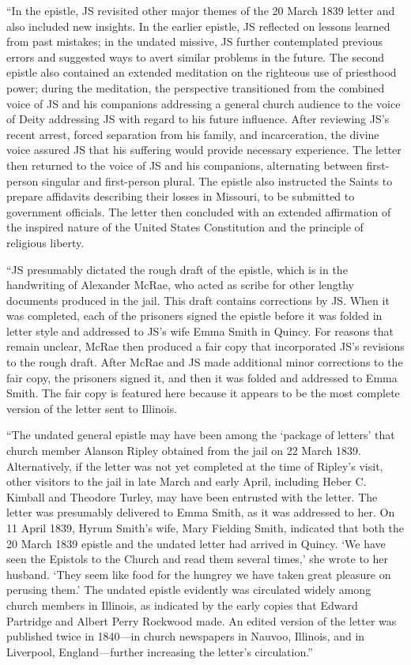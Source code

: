 			``In the epistle, JS revisited other major themes of the 20 March 1839 letter and also included new insights. In the earlier epistle, JS reflected on lessons learned from past mistakes; in the undated missive, JS further contemplated previous errors and suggested ways to avert similar problems in the future. The second epistle also contained an extended meditation on the righteous use of priesthood power; during the meditation, the perspective transitioned from the combined voice of JS and his companions addressing a general church audience to the voice of Deity addressing JS with regard to his future influence. After reviewing JS's recent arrest, forced separation from his family, and incarceration, the divine voice assured JS that his suffering would provide necessary experience. The letter then returned to the voice of JS and his companions, alternating between first-person singular and first-person plural. The epistle also instructed the Saints to prepare affidavits describing their losses in Missouri, to be submitted to government officials. The letter then concluded with an extended affirmation of the inspired nature of the United States Constitution and the principle of religious liberty.
			
			``JS presumably dictated the rough draft of the epistle, which is in the handwriting of Alexander McRae, who acted as scribe for other lengthy documents produced in the jail. This draft contains corrections by JS. When it was completed, each of the prisoners signed the epistle before it was folded in letter style and addressed to JS's wife Emma Smith in Quincy. For reasons that remain unclear, McRae then produced a fair copy that incorporated JS's revisions to the rough draft. After McRae and JS made additional minor corrections to the fair copy, the prisoners signed it, and then it was folded and addressed to Emma Smith. The fair copy is featured here because it appears to be the most complete version of the letter sent to Illinois.
			
			``The undated general epistle may have been among the `package of letters' that church member Alanson Ripley obtained from the jail on 22 March 1839. Alternatively, if the letter was not yet completed at the time of Ripley's visit, other visitors to the jail in late March and early April, including Heber C. Kimball and Theodore Turley, may have been entrusted with the letter. The letter was presumably delivered to Emma Smith, as it was addressed to her. On 11 April 1839, Hyrum Smith's wife, Mary Fielding Smith, indicated that both the 20 March 1839 epistle and the undated letter had arrived in Quincy. `We have seen the Epistols to the Church and read them several times,' she wrote to her husband. `They seem like food for the hungrey we have taken great pleasure on perusing them.' The undated epistle evidently was circulated widely among church members in Illinois, as indicated by the early copies that Edward Partridge and Albert Perry Rockwood made. An edited version of the letter was published twice in 1840---in church newspapers in Nauvoo, Illinois, and in Liverpool, England---further increasing the letter's circulation.''

